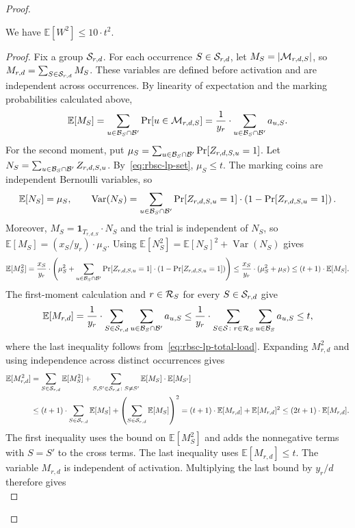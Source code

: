 \begin{proof}
\begin{claim}\label{claim:rbsc-second-moment}
We have $\mathbb{E}[W^2]\leq10\cdot t^2$.
\end{claim}
\begin{proof}
Fix a group $\mathcal{S}_{r,d}$. For each occurrence $S\in\mathcal{S}_{r,d}$, let $M_S=\mathopen{}\left| \mathcal{M}_{r,d,S} \right|$, so $M_{r,d}=\sum_{S\in\mathcal{S}_{r,d}}M_S$. These variables are defined before activation and are independent across occurrences. By linearity of expectation and the marking probabilities calculated above,
\[
 \mathbb{E}[M_S]=\sum_{u\in\mathcal{B}_S\cap\mathcal{B}'}\Pr[u\in\mathcal{M}_{r,d,S}]
 =\frac1{y_r}\cdot\sum_{u\in \mathcal{B}_S\cap\mathcal{B}'}a_{u,S}.
\]
For the second moment, put $\mu_S=\sum_{u\in\mathcal{B}_S\cap\mathcal{B}'}\Pr[Z_{r,d,S,u}=1]$. Let $N_S=\sum_{u\in\mathcal{B}_S\cap\mathcal{B}'}Z_{r,d,S,u}$. By~\eqref{eq:rbsc-lp-set}, $\mu_S\leq t$. The marking coins are independent Bernoulli variables, so
\[
 \mathbb{E}[N_S]=\mu_S,\qquad
 \operatorname{Var}(N_S)=\sum_{u\in\mathcal{B}_S\cap\mathcal{B}'}\Pr[Z_{r,d,S,u}=1]\cdot\mathopen{}\left( 1-\Pr[Z_{r,d,S,u}=1] \right).
\]
Moreover, $M_S=\boldsymbol{1}_{T_{r,d,S}}\cdot N_S$ and the trial is independent of $N_S$, so $\mathbb{E}[M_S]=(x_S/y_r)\cdot \mu_S$. Using $\mathbb{E}[N_S^2]=\mathbb{E}[N_S]^2+\operatorname{Var}(N_S)$ gives
\[
 \mathbb{E}[M_S^2]=\frac{x_S}{y_r}\cdot\mathopen{}\left( \mu_S^2+\sum_{u\in\mathcal{B}_S\cap\mathcal{B}'}\Pr[Z_{r,d,S,u}=1]\cdot\mathopen{}\left( 1-\Pr[Z_{r,d,S,u}=1] \right) \right)
 \leq\frac{x_S}{y_r}\cdot(\mu_S^2+\mu_S)
 \leq(t+1)\cdot\mathbb{E}[M_S].
\]
The first-moment calculation and $r\in\mathcal{R}_S$ for every $S\in\mathcal{S}_{r,d}$ give
\[
 \mathbb{E}[M_{r,d}]=\frac1{y_r}\cdot\sum_{S\in\mathcal{S}_{r,d}}\sum_{u\in\mathcal{B}_S\cap\mathcal{B}'}a_{u,S}
 \leq\frac1{y_r}\cdot\sum_{S\in\mathcal{S}\colon r\in\mathcal{R}_S}\sum_{u\in\mathcal{B}_S}a_{u,S}\leq t,
\]
where the last inequality follows from~\eqref{eq:rbsc-lp-total-load}. Expanding $M_{r,d}^2$ and using independence across distinct occurrences gives
\begin{align*}
 \mathbb{E}[M_{r,d}^2]
 &=\sum_{S\in\mathcal{S}_{r,d}}\mathbb{E}[M_S^2]+\sum_{S,S'\in\mathcal{S}_{r,d}\colon S\ne S'}\mathbb{E}[M_S]\cdot\mathbb{E}[M_{S'}]\\
 &\leq(t+1)\cdot\sum_{S\in\mathcal{S}_{r,d}}\mathbb{E}[M_S]+\mathopen{}\left( \sum_{S\in\mathcal{S}_{r,d}}\mathbb{E}[M_S] \right)^2
 =(t+1)\cdot\mathbb{E}[M_{r,d}]+\mathbb{E}[M_{r,d}]^2\leq(2t+1)\cdot\mathbb{E}[M_{r,d}].
\end{align*}
The first inequality uses the bound on $\mathbb{E}[M_S^2]$ and adds the nonnegative terms with $S=S'$ to the cross terms. The last inequality uses $\mathbb{E}[M_{r,d}]\leq t$.
The variable $M_{r,d}$ is independent of activation. Multiplying the last bound by $y_r/d$ therefore gives
\begin{equation}\label{eq:rbsc-group-second-moment}

\end{equation}
\end{proof}
\end{proof}
